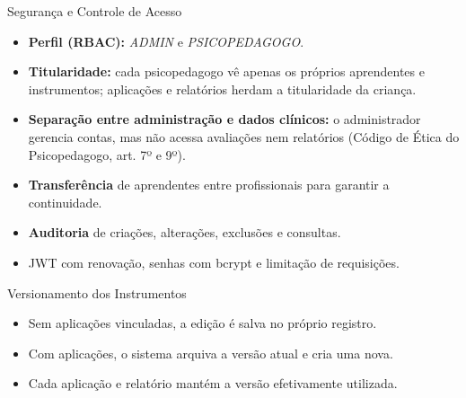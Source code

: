 \documentclass[compress]{beamer}
\begin{document}
\begin{frame}{Segurança e Controle de Acesso}
\begin{itemize}
    \small
    \item \textbf{Perfil (RBAC):} \textit{ADMIN} e \textit{PSICOPEDAGOGO}.
    \item \textbf{Titularidade:} cada psicopedagogo vê apenas os próprios aprendentes e instrumentos; aplicações e relatórios herdam a titularidade da criança.
    \item \textbf{Separação entre administração e dados clínicos:} o administrador gerencia contas, mas não acessa avaliações nem relatórios (Código de Ética do Psicopedagogo, art. 7º e 9º).
    \item \textbf{Transferência} de aprendentes entre profissionais para garantir a continuidade.
    \item \textbf{Auditoria} de criações, alterações, exclusões e consultas.
    \item JWT com renovação, senhas com bcrypt e limitação de requisições.
\end{itemize}
\end{frame}

\begin{frame}{Versionamento dos Instrumentos}
\centering
{}

\vspace{0.4cm}
\raggedright
\begin{itemize}
    \small
    \item Sem aplicações vinculadas, a edição é salva no próprio registro.
    \item Com aplicações, o sistema arquiva a versão atual e cria uma nova.
    \item Cada aplicação e relatório mantém a versão efetivamente utilizada.
\end{itemize}
\end{frame}
\end{document}
